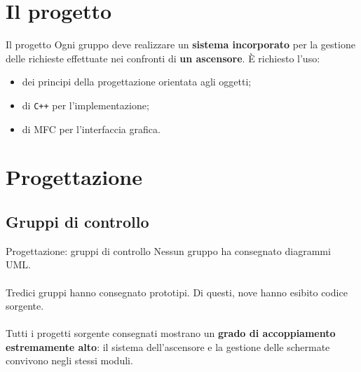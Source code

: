 \documentclass{beamer}
\begin{document}
\section{Il progetto}
\begin{frame}{Il progetto}
	Ogni gruppo deve realizzare un \textbf{sistema incorporato} per la gestione
	delle richieste effettuate nei confronti di \textbf{un ascensore}. È richiesto
	l'uso:
	\begin{itemize}
		\item dei principi della progettazione orientata agli oggetti;
		\item di \texttt{C++} per l'implementazione;
		\item di MFC per l'interfaccia grafica.
	\end{itemize}
\end{frame}

\section{Progettazione}

\subsection{Gruppi di controllo}
\begin{frame}{Progettazione: gruppi di controllo}
	Nessun gruppo ha consegnato diagrammi UML.
	\\~\\
	Tredici gruppi hanno consegnato prototipi. Di questi, nove hanno esibito
	codice sorgente.
	\\~\\
	Tutti i progetti sorgente consegnati mostrano un \textbf{grado di
		accoppiamento estremamente alto}: il sistema dell'ascensore e la gestione
	delle schermate convivono negli stessi moduli.
\end{frame}
\end{document}
